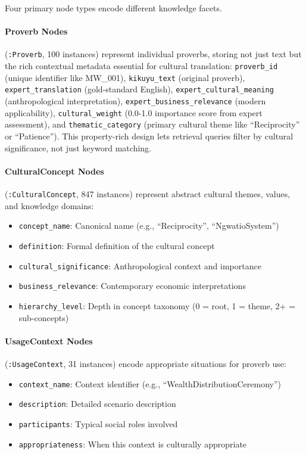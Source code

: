 Four primary node types encode different knowledge facets. \paragraph{Proverb Nodes} (\texttt{:Proverb}, 100 instances) represent individual proverbs, storing not just text but the rich contextual metadata essential for cultural translation: \texttt{proverb\_id} (unique identifier like MW\_001), \texttt{kikuyu\_text} (original proverb), \texttt{expert\_translation} (gold-standard English), \texttt{expert\_cultural\_meaning} (anthropological interpretation), \texttt{expert\_business\_relevance} (modern applicability), \texttt{cultural\_weight} (0.0-1.0 importance score from expert assessment), and \texttt{thematic\_category} (primary cultural theme like ``Reciprocity'' or ``Patience''). This property-rich design lets retrieval queries filter by cultural significance, not just keyword matching.

\paragraph{CulturalConcept Nodes} (\texttt{:CulturalConcept}, 847 instances) represent abstract cultural themes, values, and knowledge domains:
\begin{itemize}
    \item \texttt{concept\_name}: Canonical name (e.g., ``Reciprocity'', ``NgwatioSystem'')
    \item \texttt{definition}: Formal definition of the cultural concept
    \item \texttt{cultural\_significance}: Anthropological context and importance
    \item \texttt{business\_relevance}: Contemporary economic interpretations
    \item \texttt{hierarchy\_level}: Depth in concept taxonomy (0 = root, 1 = theme, 2+ = sub-concepts)
\end{itemize}

\paragraph{UsageContext Nodes} (\texttt{:UsageContext}, 31 instances) encode appropriate situations for proverb use:
\begin{itemize}
    \item \texttt{context\_name}: Context identifier (e.g., ``WealthDistributionCeremony'')
    \item \texttt{description}: Detailed scenario description
    \item \texttt{participants}: Typical social roles involved
    \item \texttt{appropriateness}: When this context is culturally appropriate
\end{itemize}

